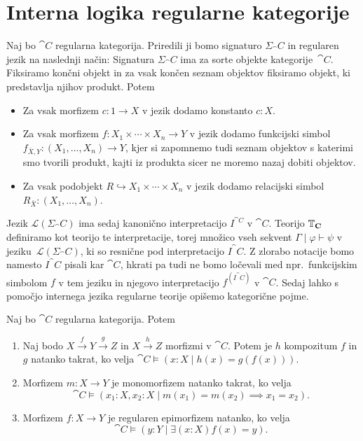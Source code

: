 \documentclass[../kategoricna_logika.tex]{subfiles}
\begin{document}
\section{Interna logika regularne kategorije}
Naj bo $\cat{C}$ regularna kategorija.  Priredili ji bomo signaturo
$\Sigma_\cat{C}$ in regularen jezik na naslednji način: Signatura
$\Sigma_\cat{C}$ ima za sorte objekte kategorije~$\cat{C}$.
Fiksiramo končni objekt in za vsak končen seznam objektov fiksiramo
objekt, ki predstavlja njihov produkt. Potem
\begin{itemize}
\item Za vsak morfizem $c : 1 \to X$ v jezik dodamo konstanto $c:X$.
\item Za vsak morfizem $f : X_1 \times \cdots \times X_n \to Y$ v jezik dodamo funkcijski
  simbol $f_{\bar{X},Y} : (X_1, \ldots, X_n) \to Y$, kjer si zapomnemo tudi seznam objektov
  s katerimi smo tvorili produkt, kajti iz produkta sicer ne moremo nazaj dobiti objektov.
\item Za vsak podobjekt $R \hookrightarrow X_1 \times \cdots \times X_n$ v jezik dodamo
  relacijski simbol $R_{\bar{X}} : (X_1, \ldots, X_n)$.
\end{itemize}
Jezik $\mathcal{L}(\Sigma_\cat{C})$ ima sedaj kanonično interpretacijo
$I^{\cat{C}}$ v $\cat{C}$.  Teorijo $\mathbb{T}_{\operatorname{\mathbf{C}}}$ definiramo kot
teorijo te interpretacije, torej množico vseh sekvent
$\Gamma \mid \varphi \vdash \psi$ v jeziku~$\mathcal{L}(\Sigma_\cat{C})$, ki so
resnične pod interpretacijo $I^\cat{C}$. Z zlorabo notacije bomo
namesto $I^\cat{C}$ pisali kar $\cat{C}$, hkrati pa tudi ne bomo
ločevali med npr.\ funkcijskim simbolom $f$ v tem jeziku in njegovo
interpretacijo $f^{(I^\cat{C})}$ v $\cat{C}$.  Sedaj lahko s pomočjo
internega jezika regularne teorije opišemo kategorične pojme.
\begin{lema}\label{lema:morfizmi-v-interni-logiki}
  Naj bo $\cat{C}$ regularna kategorija. Potem
  \begin{enumerate}[label=(\roman*)]
  \item Naj bodo $X \xrightarrow{f} Y \xrightarrow{g} Z$ in
    $X \xrightarrow{h} Z$ morfizmi v $\cat{C}$.  Potem je $h$
    kompozitum $f$ in $g$ natanko takrat, ko velja
    ${\cat{C} \models (x:X \mid  h(x) = g(f(x)))}$.
  \item Morfizem $m : X \to Y$ je monomorfizem natanko takrat, ko
    velja
    \[\cat{C} \models (x_1:X, x_2:X \mid m(x_1) = m(x_2) \implies x_1 = x_2). \]
  \item Morfizem $f : X \to Y$ je regularen epimorfizem natanko, ko
    velja
    \[ \cat{C} \models (y:Y \mid \exists (x:X) f(x) = y). \]
  \end{enumerate}
\end{lema}
\end{document}
